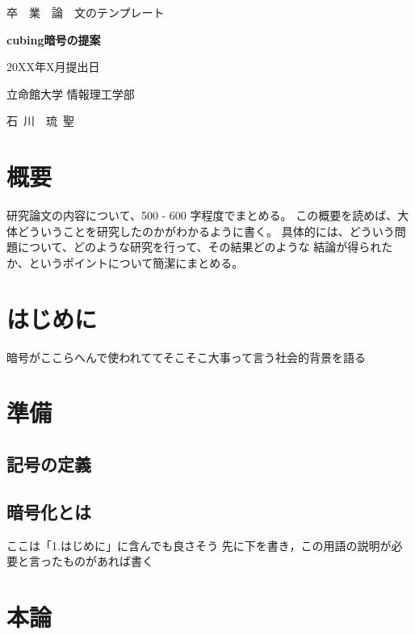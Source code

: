 \documentclass{jsarticle}
\begin{document}
\thispagestyle{empty}
\begin{center}
{\huge 卒~~業~~論~~文のテンプレート}
\vspace*{3.5cm}

{\LARGE\bf cubing暗号の提案}
\vspace*{3cm}

{\large 20XX年X月提出日}
\vspace*{3cm}

{\large 立命館大学 情報理工学部}
\vspace*{5mm}

{\Large 石~川~~琉~聖}
\end{center}
\newpage 

\setcounter{page}{1}

\section*{概要}

研究論文の内容について、500 - 600 字程度でまとめる。
この概要を読めば、大体どういうことを研究したのかがわかるように書く。
具体的には、どういう問題について、どのような研究を行って、その結果どのような
結論が得られたか、というポイントについて簡潔にまとめる。

\newpage

\tableofcontents
\clearpage

\section{はじめに}
暗号がここらへんで使われててそこそこ大事って言う社会的背景を語る

\section{準備}
\subsection{記号の定義}
\subsection{暗号化とは}
ここは「1.はじめに」に含んでも良さそう
先に下を書き，この用語の説明が必要と言ったものがあれば書く

\section{本論}
\end{document}
